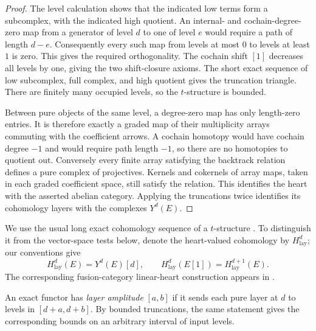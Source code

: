 \begin{proof}
The level calculation shows that the indicated low terms form a
subcomplex, with the indicated high quotient.  An internal- and
cochain-degree-zero map from a generator of level $d$ to one of
level $e$ would require a path of length $d-e$.  Consequently every
such map from levels at most $0$ to levels at least $1$ is zero.
This gives the required orthogonality.  The cochain shift $[1]$
decreases all levels by one, giving the two shift-closure axioms.
The short exact sequence of low subcomplex, full complex, and high
quotient gives the truncation triangle.  There are finitely many
occupied levels, so the $t$-structure is bounded.

Between pure objects of the same level, a degree-zero map has only
length-zero entries.  It is therefore exactly a graded map of their
multiplicity arrays commuting with the coefficient arrows.  A
cochain homotopy would have cochain degree $-1$ and would require
path length $-1$, so there are no homotopies to quotient out.
Conversely every finite array satisfying the backtrack relation
defines a pure complex of projectives.  Kernels and cokernels of
array maps, taken in each graded coefficient space, still satisfy
the relation.  This identifies the heart with the asserted abelian
category.  Applying the truncations twice identifies its cohomology
layers with the complexes $Y^d(E)$.
\end{proof}

We use the usual long exact cohomology sequence of a $t$-structure
\cite[Theorem~1.3.6]{BBD1982}.  To distinguish it from the vector-space tests
below, denote the heart-valued cohomology by $H^d_{\mathrm{lay}}$;
our conventions give
\[
 H^d_{\mathrm{lay}}(E)=Y^d(E)[d],\qquad
 H^d_{\mathrm{lay}}(E[1])=H^{d+1}_{\mathrm{lay}}(E).
\]
The corresponding fusion-category linear-heart construction appears in
\cite[\S6.1]{HengLicata2024}.

An exact functor has \emph{layer amplitude} $[a,b]$ if it sends each
pure layer at $d$ to levels in $[d+a,d+b]$.  By bounded truncations,
the same statement gives the corresponding bounds on an arbitrary
interval of input levels.

